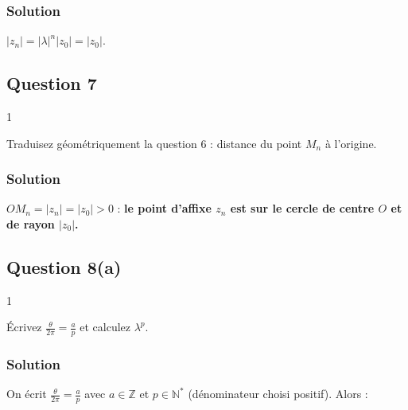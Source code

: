 \documentclass[11pt,a4paper]{article}
\newcommand{\equationajustee}[1]{%
  \sbox{\boiteequation}{$\displaystyle #1$}%
  \ifdim\wd\boiteequation>\linewidth
    \[\resizebox{\linewidth}{!}{\usebox{\boiteequation}}\]%
  \else
    \[#1\]%
  \fi}
\begin{document}
\hypertarget{solution-48}{%
\subsubsection{Solution}\label{solution-48}}

\(|z_n|=|\lambda|^n|z_0|=|z_0|\).

\hypertarget{question-7}{%
\subsection{Question 7}\label{question-7}}

\begin{indication}{1}

Traduisez géométriquement la question 6 : distance du point \(M_n\) à l'origine.

\end{indication}

\hypertarget{solution-49}{%
\subsubsection{Solution}\label{solution-49}}

\(OM_n=|z_n|=|z_0|>0\) : \textbf{le point d'affixe \(z_n\) est sur le cercle de centre \(O\) et de rayon \(|z_0|\).}

\hypertarget{question-8a}{%
\subsection{Question 8(a)}\label{question-8a}}

\begin{indication}{1}

Écrivez \(\frac\theta{2\pi}=\frac ap\) et calculez \(\lambda^p\).

\end{indication}

\hypertarget{solution-50}{%
\subsubsection{Solution}\label{solution-50}}

On écrit \(\frac\theta{2\pi}=\frac ap\) avec \(a\in\mathbb{Z}\) et \(p\in{\mathbb{N}}^*\) (dénominateur choisi positif). Alors :

\equationajustee{\begin{aligned}
\lambda^p&=e^{ip\theta}\\
&=e^{2ia\pi}=1.
\end{aligned}}
\end{document}
